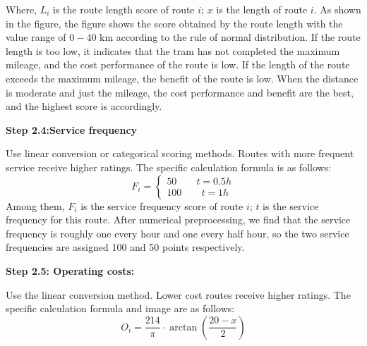 \documentclass[12pt]{article}
\begin{document}
Where, $L_i$ is the route length score of route $i$; $x$ is the length of route $i$. As shown in the figure, the figure shows the score obtained by the route length with 
the value range of $0-40$ km according to the rule of normal distribution. If the route length is too low, it indicates that the tram has not completed the maximum 
mileage, and the cost performance of the route is low. If the length of the route exceeds the maximum mileage, the benefit of the route is low. When the distance 
is moderate and just the mileage, the cost performance and benefit are the best, and the highest score is accordingly.

\textbf{Step 2.4:Service frequency}

Use linear conversion or categorical scoring methods. Routes with more frequent service receive higher ratings. 
The specific calculation formula is as follows:
\begin{equation}
F_i=\left\{\begin{matrix} 
	50  \qquad t=0.5h\\ 
	100 \qquad t=1h
	\end{matrix}\right.  
\end{equation}  
Among them, $F_i$ is the service frequency score of route $i$; $t$ is the service frequency for this route. After numerical preprocessing, 
we find that the service frequency is roughly one every hour and one every half hour, so the two service frequencies are assigned 100 and 50 points 
respectively.

\textbf{Step 2.5: Operating costs:}

Use the linear conversion method. Lower cost routes receive higher ratings. The specific calculation formula and image are as follows:
\begin{equation}
	O_i = \frac{214}{\pi} \cdot \arctan{\left(\frac{20-x}{2}\right)} 
\end{equation}
\end{document}
